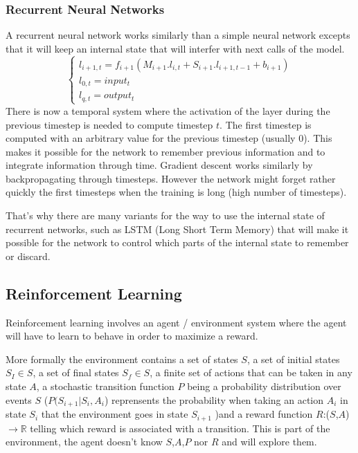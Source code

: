 \documentclass[11pt]{article}
\begin{document}
\subsubsection{Recurrent Neural Networks}
A recurrent neural network works similarly than a simple neural network excepts that it will keep an internal state that will interfer with next calls of the model.
\begin{equation*}
\begin{cases}
l_{i+1,t} = f_{i+1}(M_{i+1}. l_{i,t} + S_{i+1}.l_{i+1,t-1} + b_{i+1}) \\
l_{0,t} = input_t \\
l_{q,t} = output_t
\end{cases}
\end{equation*}
There is now a temporal system where the activation of the layer during the previous timestep is needed to compute timestep $t$. The first timestep is computed with an arbitrary value for the previous timestep (usually 0). This makes it possible for the network to remember previous information and to integrate information through time. Gradient descent works similarly by backpropagating through timesteps. However the network might forget rather quickly the first timesteps when the training is long (high number of timesteps).

That's why there are many variants for the way to use the internal state of recurrent networks, such as LSTM (Long Short Term Memory) that will make it possible for the network to control which parts of the internal state to remember or discard.


\subsection{Reinforcement Learning}
Reinforcement learning involves an agent / environment system where the agent will have to learn to behave in order to maximize a reward.

More formally the environment contains a set of states $S$, a set of initial states $S_I\in S$, a set of final states $S_f \in S$, a finite set of actions that can be taken in any state $A$, a stochastic transition function $P$ being a probability distribution over events $S$ ($P(S_{i+1}|S_i,A_i$) reprensents the probability when taking an action $A_i$ in state $S_i$ that the environment goes in state $S_{i+1}$ )and a reward function $R$:($S$,$A$)$\rightarrow\mathbb{R}$ telling which reward is associated with a transition. This is part of the environment, the agent doesn't know $S$,$A$,$P$ nor $R$ and will explore them.
\end{document}
